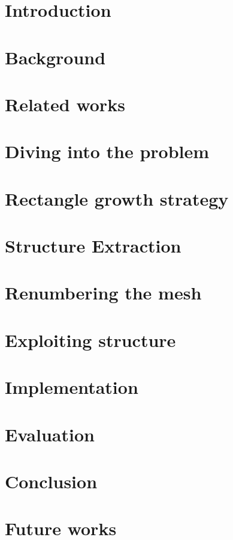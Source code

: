 \documentclass[titlepage]{report}
\begin{document}




\tableofcontents

\chapter{Introduction}


\chapter{Background}


\chapter{Related works}


\chapter{Diving into the problem}


\chapter{Rectangle growth strategy}


\chapter{Structure Extraction}


\chapter{Renumbering the mesh} %


\chapter{Exploiting structure}


\chapter{Implementation}


\chapter{Evaluation}


\chapter{Conclusion}


\chapter{Future works}



\nocite{*} %


\end{document}
